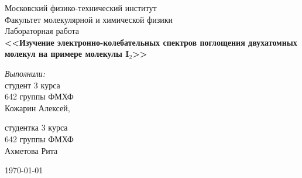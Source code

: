 \begin{titlepage}
\begin{center} 
 
\large Московский физико-технический институт\\
Факультет молекулярной и химической физики\\
\vspace{7cm}
\huge Лабораторная работа\\
\textbf{\Large <<Изучение электронно-колебательных спектров поглощения двухатомных молекул на примере молекулы I$_2$>>}\\
\end{center} 

\vspace{7.5cm}
{\par \raggedleft \large \emph{Выполнили:}\\ 
	студент 3 курса\\ 
	642 группы ФМХФ\\ 
	Кожарин Алексей, \par
	студентка 3 курса\\ 
	642 группы ФМХФ\\ 
	Ахметова Рита \par
}
\begin{center}
\vfill \today
\date \today
\end{center}
\end{titlepage}
\newpage
